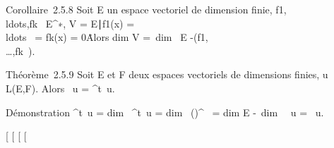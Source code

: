Corollaire~2.5.8 Soit E un espace vectoriel de dimension finie,
f1,\\ldots,fk~
\in E^∗, V = \x \in
E∣f1(x) =
\\ldots~ =
fk(x) = 0\. Alors
dim V =\ dim~ E
-\mathrmrg(f1,\\\ldots,fk~).

Théorème~2.5.9 Soit E et F deux espaces vectoriels de dimensions finies,
u \in L(E,F). Alors
\mathrmrg~u
= \mathrmrg^t~u.

Démonstration
\mathrmrg^t~u
= dim~
\mathrmIm^t~u
= dim~
(\mathrmKeru)^\bot~
= dim E -\ dim~
\mathrmKer~u
= \mathrmrg~u.

{[}
{[}
{[}
{[}
